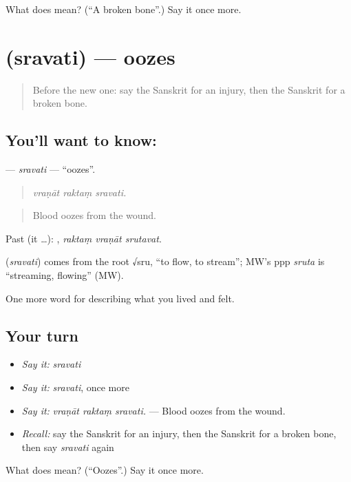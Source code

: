 \begin{tcolorbox}[breakable,colback=teal!4,colframe=teal!35!black,title={Before you move on}]
What does  mean? (\textquotedblleft{}A broken bone\textquotedblright{}.) Say it once more.
\end{tcolorbox}
\section[\texorpdfstring{\sk{स्रवति} (sravati)}{स्रवति (sravati)}]{ (sravati) — oozes}

\label{lesson:SA-C480-sravati}



\begin{quote}
Before the new one: say the Sanskrit for an injury, then the Sanskrit for a broken bone.
\end{quote}

\subsection*{You'll want to know: }
\textbf{} — \emph{sravati} — \textquotedblleft{}oozes\textquotedblright{}.

\begin{quote}
  
\end{quote}

\begin{quote}
\emph{vraṇāt raktaṃ sravati.}
\end{quote}

\begin{quote}
Blood oozes from the wound.
\end{quote}

Past (it …):   , \emph{raktaṃ vraṇāt srutavat}.

\begin{cousinweb}
\textbf{} (\emph{sravati}) comes from the root √sru, \textquotedblleft{}to flow, to stream\textquotedblright{}; MW's ppp \emph{sruta} is \textquotedblleft{}streaming, flowing\textquotedblright{} (MW).
\end{cousinweb}

\begin{grammarlens}[title={What you've built}]
One more word for describing what you lived and felt.
\end{grammarlens}

\subsection*{Your turn}
\begin{itemize}
\raggedright
  \item \emph{Say it:} \emph{sravati}
  \item \emph{Say it:} \emph{sravati}, once more
  \item \emph{Say it:} \emph{vraṇāt raktaṃ sravati.} — Blood oozes from the wound.
  \item \emph{Recall:} say the Sanskrit for an injury, then the Sanskrit for a broken bone, then say \emph{sravati} again
\end{itemize}

\begin{tcolorbox}[breakable,colback=teal!4,colframe=teal!35!black,title={Before you move on}]
What does  mean? (\textquotedblleft{}Oozes\textquotedblright{}.) Say it once more.
\end{tcolorbox}

